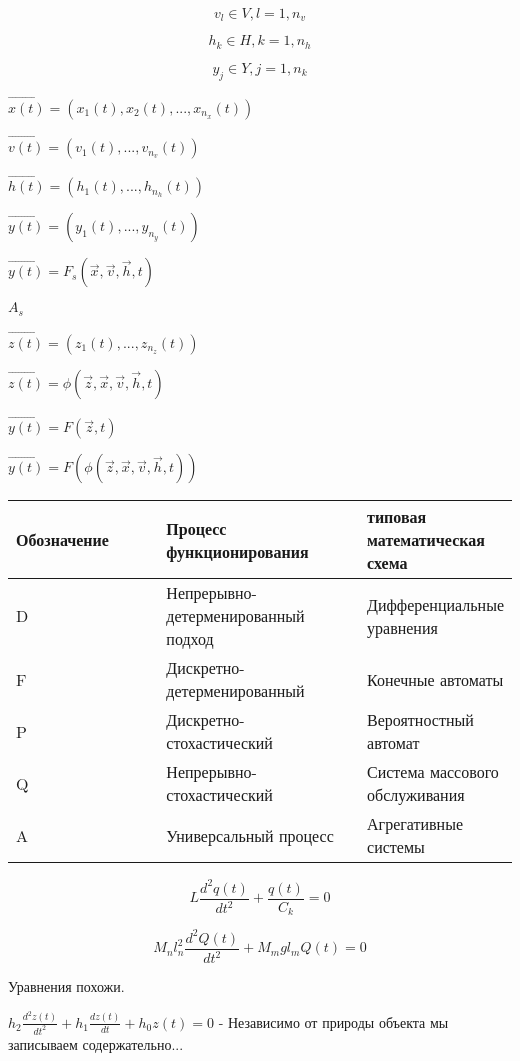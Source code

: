\documentclass[a4paper,14pt]{extarticle}
\begin{document}
 	
 	\[v_l \in V, l = 1, n_v\]
 	
 	\[h_k \in H, k = 1,n_h\]
 	
 	\[y_j \in Y, j = 1, n_k\]
 	
 	$\vec{x(t)} = (x_1(t), x_2(t), ..., x_{n_x}(t))$
 	
 	$\vec{v(t)} = (v_1(t), ..., v_{n_v}(t))$

	$\vec{h(t)} = (h_1(t), ..., h_{n_h}(t))$
	
	$\vec{y(t)} = (y_1(t), ..., y_{n_y}(t))$
 	
 	$\vec{y(t)} = F_s(\vec{x}, \vec{v}, \vec{h}, t)$
 	
 	$A_s$
 	
 	$\vec{z(t)} = (z_1(t), ..., z_{n_z}(t))$
 	
 	$\vec{z(t)} = \phi(\vec{z}, \vec{x}, \vec{v}, \vec{h}, t)$
 	
 	$\vec{y(t)} = F(\vec{z}, t)$
 	
 	$\vec{y(t)} = F(\phi(\vec{z}, \vec{x}, \vec{v}, \vec{h}, t))$
 	
 	\begin{center}
 		\begin{longtable}[h!]{|p{0.3\linewidth}|p{0.4\linewidth}|p{ 0.3\linewidth}|}
 			\hline
 			{Обозначение} & {Процесс функционирования} & {типовая математическая схема}\\
 			\hline
 			{D} & {Непрерывно-детерменированный подход} & {Дифференциальные уравнения} \\
 			\hline
 			{F} & {Дискретно-детерменированный} & {Конечные автоматы}\\
 			\hline
 			{P} & {Дискретно-стохастический} & {Вероятностный автомат}\\
 			\hline
 			{Q} & {Непрерывно-стохастический} & {Система массового обслуживания}\\
 			\hline
 			{A} & {Универсальный процесс} & {Агрегативные системы}\\
 			\hline
 			\end{longtable}
 		\end{center}
 	
 	\[
 	L\frac{d^2q(t)}{dt^2} + \frac{q(t)}{C_k} = 0
 	\]
 	
 	
 	\[
 	M_n l_n^2 \frac{d^2 Q(t)}{dt^2} + M_m g l_m Q(t) = 0
 	\]
 	
 	Уравнения похожи.
 	
 	$h_2 \frac{d^2 z(t)}{dt^2} + h_1 \frac{dz(t)}{dt} + h_0 z(t) = 0$ - Независимо от природы объекта мы записываем содержательно...
 	
 	
 	
\end{document}
